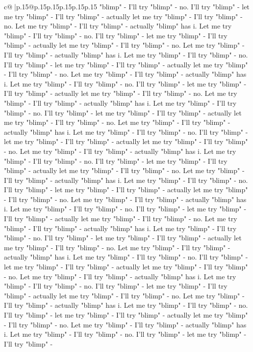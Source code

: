\documentclass{article}
\begin{document}
{\begin{supertabular}{c@{$\;$}|p{.15\linewidth}@{}p{.15\linewidth}p{.15\linewidth}p{.15\linewidth}p{.15\linewidth}p{.15\linewidth}}
{{{"blimp" {-} I'll try "blimp" {-} no. I'll try "blimp" {-} let me try "blimp" {-} I'll try "blimp" {-} actually let me try "blimp" {-} I'll try "blimp" {-} no. Let me try "blimp" {-} I'll try "blimp" {-} actually "blimp" has i. Let me try "blimp" {-} I'll try "blimp" {-} no. I'll try "blimp" {-} let me try "blimp" {-} I'll try "blimp" {-} actually let me try "blimp" {-} I'll try "blimp" {-} no. Let me try "blimp" {-} I'll try "blimp" {-} actually "blimp" has i. Let me try "blimp" {-} I'll try "blimp" {-} no. I'll try "blimp" {-} let me try "blimp" {-} I'll try "blimp" {-} actually let me try "blimp" {-} I'll try "blimp" {-} no. Let me try "blimp" {-} I'll try "blimp" {-} actually "blimp" has i. Let me try "blimp" {-} I'll try "blimp" {-} no. I'll try "blimp" {-} let me try "blimp" {-} I'll try "blimp" {-} actually let me try "blimp" {-} I'll try "blimp" {-} no. Let me try "blimp" {-} I'll try "blimp" {-} actually "blimp" has i. Let me try "blimp" {-} I'll try "blimp" {-} no. I'll try "blimp" {-} let me try "blimp" {-} I'll try "blimp" {-} actually let me try "blimp" {-} I'll try "blimp" {-} no. Let me try "blimp" {-} I'll try "blimp" {-} actually "blimp" has i. Let me try "blimp" {-} I'll try "blimp" {-} no. I'll try "blimp" {-} let me try "blimp" {-} I'll try "blimp" {-} actually let me try "blimp" {-} I'll try "blimp" {-} no. Let me try "blimp" {-} I'll try "blimp" {-} actually "blimp" has i. Let me try "blimp" {-} I'll try "blimp" {-} no. I'll try "blimp" {-} let me try "blimp" {-} I'll try "blimp" {-} actually let me try "blimp" {-} I'll try "blimp" {-} no. Let me try "blimp" {-} I'll try "blimp" {-} actually "blimp" has i. Let me try "blimp" {-} I'll try "blimp" {-} no. I'll try "blimp" {-} let me try "blimp" {-} I'll try "blimp" {-} actually let me try "blimp" {-} I'll try "blimp" {-} no. Let me try "blimp" {-} I'll try "blimp" {-} actually "blimp" has i. Let me try "blimp" {-} I'll try "blimp" {-} no. I'll try "blimp" {-} let me try "blimp" {-} I'll try "blimp" {-} actually let me try "blimp" {-} I'll try "blimp" {-} no. Let me try "blimp" {-} I'll try "blimp" {-} actually "blimp" has i. Let me try "blimp" {-} I'll try "blimp" {-} no. I'll try "blimp" {-} let me try "blimp" {-} I'll try "blimp" {-} actually let me try "blimp" {-} I'll try "blimp" {-} no. Let me try "blimp" {-} I'll try "blimp" {-} actually "blimp" has i. Let me try "blimp" {-} I'll try "blimp" {-} no. I'll try "blimp" {-} let me try "blimp" {-} I'll try "blimp" {-} actually let me try "blimp" {-} I'll try "blimp" {-} no. Let me try "blimp" {-} I'll try "blimp" {-} actually "blimp" has i. Let me try "blimp" {-} I'll try "blimp" {-} no. I'll try "blimp" {-} let me try "blimp" {-} I'll try "blimp" {-} actually let me try "blimp" {-} I'll try "blimp" {-} no. Let me try "blimp" {-} I'll try "blimp" {-} actually "blimp" has i. Let me try "blimp" {-} I'll try "blimp" {-} no. I'll try "blimp" {-} let me try "blimp" {-} I'll try "blimp" {-} actually let me try "blimp" {-} I'll try "blimp" {-} no. Let me try "blimp" {-} I'll try "blimp" {-} actually "blimp" has i. Let me try "blimp" {-} I'll try "blimp" {-} no. I'll try "blimp" {-} let me try "blimp" {-} I'll try "blimp" {-} }}}
\end{supertabular}}
\end{document}
